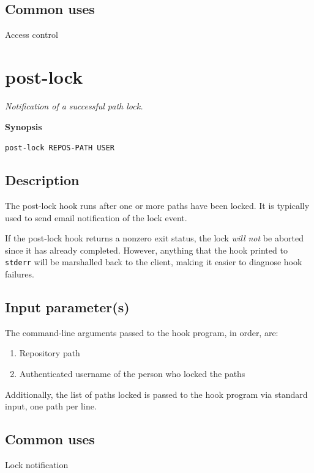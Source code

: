 \subsection{Common uses}

Access control

\section{post-lock}\label{svn.ref.reposhooks.post-lock}

\emph{Notification of a successful path lock.}

\textbf{Synopsis}

\texttt{post-lock\ REPOS-PATH\ USER}

\subsection{Description}

The post-lock hook runs after one or more paths have been locked. It is
typically used to send email notification of the lock event.

If the post-lock hook returns a nonzero exit status, the lock \emph{will
not} be aborted since it has already completed. However, anything that
the hook printed to \texttt{stderr} will be marshalled back to the
client, making it easier to diagnose hook failures.

\subsection{Input parameter(s)}

The command-line arguments passed to the hook program, in order, are:

\begin{enumerate}
\def\labelenumi{\arabic{enumi}.}
\item
  Repository path
\item
  Authenticated username of the person who locked the paths
\end{enumerate}

Additionally, the list of paths locked is passed to the hook program via
standard input, one path per line.

\subsection{Common uses}

Lock notification

